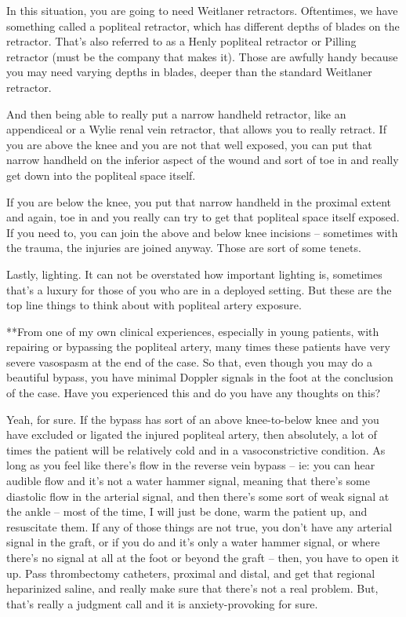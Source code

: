 \documentclass[
]{book}
\begin{document}
In this situation, you are going to need Weitlaner retractors.
Oftentimes, we have something called a popliteal retractor, which has
different depths of blades on the retractor. That's also referred to as
a Henly popliteal retractor or Pilling retractor (must be the company
that makes it). Those are awfully handy because you may need varying
depths in blades, deeper than the standard Weitlaner retractor.

And then being able to really put a narrow handheld retractor, like an
appendiceal or a Wylie renal vein retractor, that allows you to really
retract. If you are above the knee and you are not that well exposed,
you can put that narrow handheld on the inferior aspect of the wound and
sort of toe in and really get down into the popliteal space itself.

If you are below the knee, you put that narrow handheld in the proximal
extent and again, toe in and you really can try to get that popliteal
space itself exposed. If you need to, you can join the above and below
knee incisions -- sometimes with the trauma, the injuries are joined
anyway. Those are sort of some tenets.

Lastly, lighting. It can not be overstated how important lighting is,
sometimes that's a luxury for those of you who are in a deployed
setting. But these are the top line things to think about with popliteal
artery exposure.

**From one of my own clinical experiences, especially in young
patients, with repairing or bypassing the popliteal artery, many times
these patients have very severe vasospasm at the end of the case. So
that, even though you may do a beautiful bypass, you have minimal
Doppler signals in the foot at the conclusion of the case. Have you
experienced this and do you have any thoughts on this?

Yeah, for sure. If the bypass has sort of an above knee-to-below knee
and you have excluded or ligated the injured popliteal artery, then
absolutely, a lot of times the patient will be relatively cold and in a
vasoconstrictive condition. As long as you feel like there's flow in the
reverse vein bypass -- ie: you can hear audible flow and it's not a
water hammer signal, meaning that there's some diastolic flow in the
arterial signal, and then there's some sort of weak signal at the ankle
-- most of the time, I will just be done, warm the patient up, and
resuscitate them. If any of those things are not true, you don't have
any arterial signal in the graft, or if you do and it's only a water
hammer signal, or where there's no signal at all at the foot or beyond
the graft -- then, you have to open it up. Pass thrombectomy catheters,
proximal and distal, and get that regional heparinized saline, and
really make sure that there's not a real problem. But, that's really a
judgment call and it is anxiety-provoking for sure.
\end{document}
